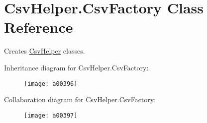 \hypertarget{a00064}{\section{Csv\-Helper.\-Csv\-Factory Class Reference}
\label{a00064}
}


Creates \hyperlink{a00314}{Csv\-Helper} classes.  




Inheritance diagram for Csv\-Helper.\-Csv\-Factory\-:
\nopagebreak
\begin{figure}[H]
\begin{center}
\leavevmode
\texttt{[image: a00396]}
\end{center}
\end{figure}


Collaboration diagram for Csv\-Helper.\-Csv\-Factory\-:
\nopagebreak
\begin{figure}[H]
\begin{center}
\leavevmode
\texttt{[image: a00397]}
\end{center}
\end{figure}

